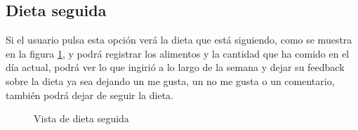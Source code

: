 \subsection{Dieta seguida}
Si el usuario pulsa esta opción verá la dieta que está siguiendo, como se muestra en la figura \ref{fig:dieta_seguida}, y podrá registrar los alimentos y la cantidad que ha comido en el día actual, podrá ver lo que ingirió a lo largo de la semana y dejar su feedback sobre la dieta ya sea dejando un me gusta, un no me gusta o un comentario, también podrá dejar de seguir la dieta.

\begin{figure}[H]
    \centering
    \caption{Vista de dieta seguida}
    \label{fig:dieta_seguida}
\end{figure}

